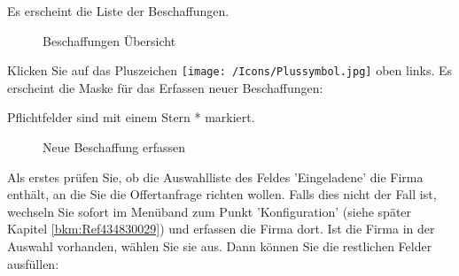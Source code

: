 Es erscheint die Liste der Beschaffungen.

\vspace{2cm}

\begin{figure}[H]
\caption{Beschaffungen Übersicht}
\end{figure}


Klicken Sie auf das Pluszeichen \texttt{[image: /Icons/Plussymbol.jpg]}  oben links. Es erscheint die Maske für das Erfassen neuer Beschaffungen:

\vspace{\baselineskip}

Pflichtfelder sind mit einem Stern * markiert.

\begin{figure}[H]
\caption{Neue Beschaffung erfassen}
\end{figure}

Als erstes prüfen Sie, ob die Auswahlliste des Feldes 'Eingeladene'  die Firma enthält, an die Sie die Offertanfrage richten wollen. Falls dies nicht der Fall ist, wechseln Sie sofort im Menüband zum Punkt 'Konfiguration' (siehe später Kapitel \ref{bkm:Ref434830029}) und erfassen die Firma dort. Ist die Firma in der Auswahl vorhanden, wählen Sie sie aus. Dann können Sie die restlichen Felder ausfüllen:

\vspace{\baselineskip}

